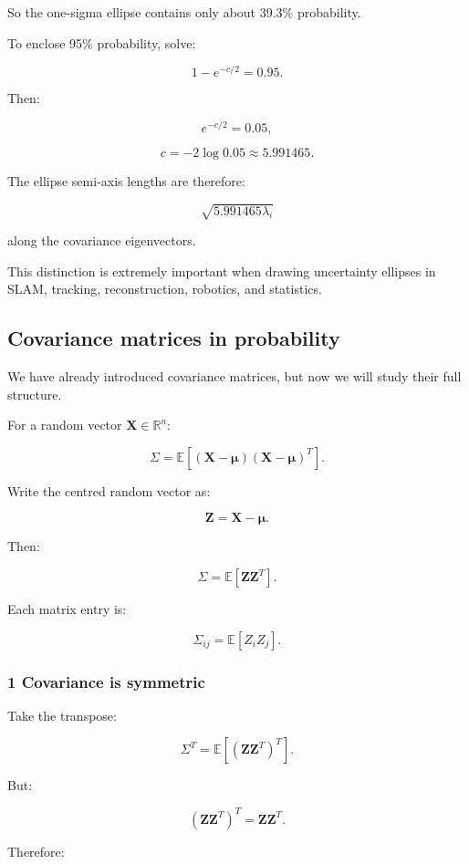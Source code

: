 So the one-sigma ellipse contains only about 39.3\% probability.

To enclose 95\% probability, solve:

\[
 1-e^{-c/2}=0.95.
\]

Then:

\[
 e^{-c/2}=0.05,
\]

\[
 c=-2\log0.05\approx5.991465.
\]

The ellipse semi-axis lengths are therefore:

\[
 \sqrt{5.991465\lambda_i}
\]

along the covariance eigenvectors.

This distinction is extremely important when drawing uncertainty ellipses in SLAM, tracking, reconstruction, robotics, and statistics.

\subsection{Covariance matrices in probability}\label{02-foundations-ii-ch024-covariance-matrices-in-probability}

We have already introduced covariance matrices, but now we will study their full structure.

For a random vector \(\mathbf X\in\mathbb R^n\):

\[
 \boxed{ \Sigma= \mathbb E[ (\mathbf X-\boldsymbol\mu) (\mathbf X-\boldsymbol\mu)^T ] }.
\]

Write the centred random vector as:

\[
 \mathbf Z=\mathbf X-\boldsymbol\mu.
\]

Then:

\[
 \Sigma=\mathbb E[\mathbf Z\mathbf Z^T].
\]

Each matrix entry is:

\[
 \Sigma_{ij}=\mathbb E[Z_iZ_j].
\]

\subsubsection{1 Covariance is symmetric}\label{02-foundations-ii-ch024-covariance-is-symmetric}

Take the transpose:

\[
 \Sigma^T = \mathbb E[(\mathbf Z\mathbf Z^T)^T].
\]

But:

\[
 (\mathbf Z\mathbf Z^T)^T = \mathbf Z\mathbf Z^T.
\]

Therefore:

